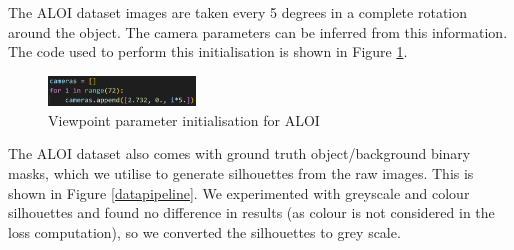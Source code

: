 \documentclass{article}
\begin{document}
The ALOI dataset images are taken every 5 degrees in a complete rotation around the object. The camera parameters can be inferred from this information. The code used to perform this initialisation is shown in Figure \ref{camerainitaloi}.

\begin{figure}[h!]
  \centering
  \includegraphics[width=0.35\textwidth]{images/initcamera.png}
  \caption{Viewpoint parameter initialisation for ALOI}
  \label{camerainitaloi}
\end{figure}

The ALOI dataset also comes with ground truth object/background binary masks, which we utilise to generate silhouettes from the raw images. This is shown in Figure \ref{datapipeline}. We experimented with greyscale and colour silhouettes and found no difference in results (as colour is not considered in the loss computation), so we converted the silhouettes to grey scale.
\end{document}
